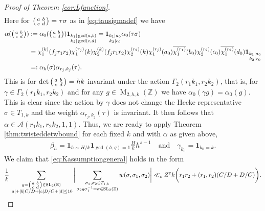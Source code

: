 \documentclass[12pt]{amsart}
\theoremstyle{definition}
\theoremstyle{remark}
\numberwithin{equation}{section}
\newcommand{\R}{{\mathbb R}}
\newcommand{\Z}{{\mathbb Z}}
\newcommand{\1}{{\mathbf 1}}
\newcommand{\eps}{\varepsilon}
\newcommand{\SL}{\operatorname{SL}_2}
\newcommand{\MM}{\operatorname{M}}
\begin{document}
\begin{proof}[Proof of Theorem \ref{cor:Lfunction}]
\begin{align*}
\end{align*}
Here for $\smqty(a&b \\ c& d)=\tau \sigma$ as in \eqref{eq:tausigmadef} we have
\begin{align} \nonumber
\alpha(\smqty(a & b \\ c & d)) &:=  \alpha_0(\smqty(a & b \\ c & d)) \mathbf{1}_{\substack{k_1|\gcd(a,b )\\ k_2 |\gcd(c,d) }} = \mathbf{1}_{\substack{k_1 | a_0 \\ k_2 | c_0}} \alpha_0(\tau \sigma)   \\ \nonumber
&= \chi^{(k)}_{1} (f_j r_1 r_2) \chi_{1}^{(r_j)}(k )\chi^{(k)}_{2} (f_j r_1 r_2) \chi_{2}^{(r_2)}(k)   \chi_{1}^{(r_j)}( a_0) \overline{\chi_{1}^{(r_1)}}(b_0) \chi_{2}^{(r_2)}( c_0) \overline{\chi_{1}^{(r_2)}}(d_0) \mathbf{1}_{\substack{k_1 | a_0 \\ k_2 | c_0}}  \\ \label{eq:alphakrk}
&=: \alpha_k (\sigma) \alpha_{r_j,k_j}(\tau).
\end{align}
This is for $\det \smqty(a & b \\ c & d)=hk$ invariant under the action $\Gamma_2(r_1 k_1 ,r_2k_2)$, that is, for $\gamma \in \Gamma_2(r_1k_1,r_2k_2) $  and for any $g \in \MM_{2,h,k}(\Z)$ we have $\alpha_0(\gamma g) = \alpha_0(g)$. This is clear since the action by $\gamma$ does not change the Hecke representative $\sigma \in T_{1,k}$ and the weight $\alpha_{r_j,k_j}(\tau)$ is invariant. It then follows that $\alpha \in \mathcal{A}(r_1k_1,r_2k_2,1,1)$. Thus, we are ready to apply Theorem \ref{thm:twisteddetwbound} for each fixed $k$ and with $\alpha$ as given above,
\begin{align*}
    \beta_h = \mathbf{1}_{h \sim H/k}\mathbf{1}_{\gcd(h,q)=1}\frac{H}{k} h^{s-1}\quad \text{and} \quad \gamma_{k_0} = \mathbf{1}_{k_0 = k}.
\end{align*}
We claim that \eqref{eq:Kassumptiongeneral} holds in the form
\begin{align} \label{claim:LfunctionKbound}
   \frac{1}{k}\sum_{\substack{g = \smqty(a &b \\ c &d ) \in \SL(\R) \\ |a| + |b|C/D + |c|D/C + |d| \leq 10 }} \bigg| \sum_{\substack{\sigma_1,\sigma_2 \in T_{1,k} \\ \sigma_2 g \sigma_1^{-1} =\sigma \in \SL(\Z) }} w(\sigma,\sigma_1,\sigma_2)\bigg| \ll_\eps   Z^{\eps} k \bigg(r_1r_2 + (r_1,r_2) ( C/D + D/C)\bigg).
\end{align}

\end{proof}
\end{document}
